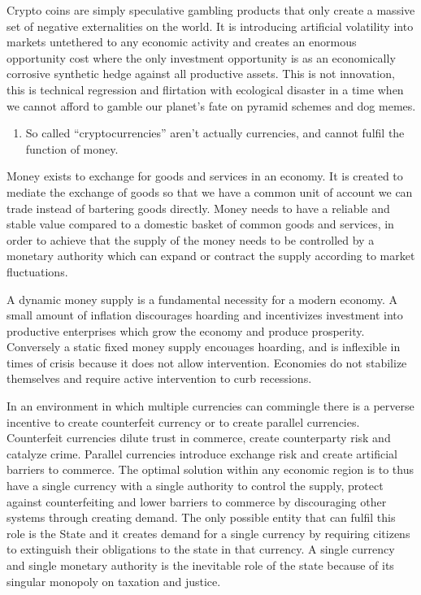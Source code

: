 \documentclass[
]{book}
\providecommand{\tightlist}{%
  \setlength{\itemsep}{0pt}\setlength{\parskip}{0pt}}
\begin{document}
Crypto coins are simply speculative gambling products that only create a massive set of negative externalities on the world. It is introducing artificial volatility into markets untethered to any economic activity and creates an enormous opportunity cost where the only investment opportunity is as an economically corrosive synthetic hedge against all productive assets. This is not innovation, this is technical regression and flirtation with ecological disaster in a time when we cannot afford to gamble our planet's fate on pyramid schemes and dog memes.

\begin{enumerate}
\def\labelenumi{\arabic{enumi}.}
\setcounter{enumi}{1}
\tightlist
\item
  So called ``cryptocurrencies'' aren't actually currencies, and cannot fulfil the function of money.
\end{enumerate}

Money exists to exchange for goods and services in an economy. It is created to mediate the exchange of goods so that we have a common unit of account we can trade instead of bartering goods directly. Money needs to have a reliable and stable value compared to a domestic basket of common goods and services, in order to achieve that the supply of the money needs to be controlled by a monetary authority which can expand or contract the supply according to market fluctuations.

A dynamic money supply is a fundamental necessity for a modern economy. A small amount of inflation discourages hoarding and incentivizes investment into productive enterprises which grow the economy and produce prosperity. Conversely a static fixed money supply encouages hoarding, and is inflexible in times of crisis because it does not allow intervention. Economies do not stabilize themselves and require active intervention to curb recessions.

In an environment in which multiple currencies can commingle there is a perverse incentive to create counterfeit currency or to create parallel currencies. Counterfeit currencies dilute trust in commerce, create counterparty risk and catalyze crime. Parallel currencies introduce exchange risk and create artificial barriers to commerce. The optimal solution within any economic region is to thus have a single currency with a single authority to control the supply, protect against counterfeiting and lower barriers to commerce by discouraging other systems through creating demand. The only possible entity that can fulfil this role is the State and it creates demand for a single currency by requiring citizens to extinguish their obligations to the state in that currency. A single currency and single monetary authority is the inevitable role of the state because of its singular monopoly on taxation and justice.
\end{document}
